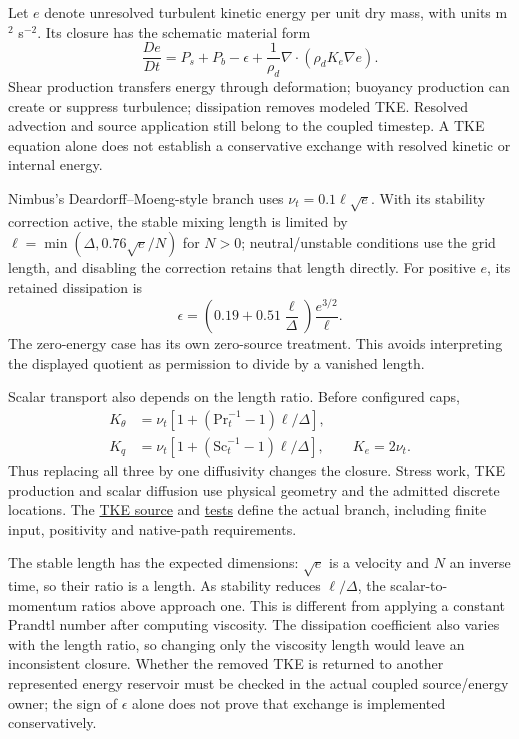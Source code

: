 Let $e$ denote unresolved turbulent kinetic energy per unit dry mass, with units
m$^2$ s$^{-2}$. Its closure has the schematic material form
\[
 \frac{De}{Dt}=P_s+P_b-\epsilon
       +\frac{1}{\rho_d}\nabla\!\cdot(\rho_dK_e\nabla e).
\]
Shear production transfers energy through deformation; buoyancy production can
create or suppress turbulence; dissipation removes modeled TKE. Resolved
advection and source application still belong to the coupled timestep. A TKE
equation alone does not establish a conservative exchange with resolved kinetic
or internal energy.

Nimbus's Deardorff--Moeng-style branch uses $\nu_t=0.1\ell\sqrt e$. With its
stability correction active, the stable mixing length is limited by
$\ell=\min(\Delta,0.76\sqrt e/N)$ for $N>0$; neutral/unstable conditions use
the grid length, and disabling the correction retains that length directly.
For positive $e$, its retained dissipation is
\[
 \epsilon=\left(0.19+0.51\frac{\ell}{\Delta}\right)
             \frac{e^{3/2}}{\ell}.
\]
The zero-energy case has its own zero-source treatment. This avoids interpreting
the displayed quotient as permission to divide by a vanished length.

Scalar transport also depends on the length ratio. Before configured caps,
\[
\begin{aligned}
 K_\theta&=\nu_t\left[1+
        (\mathrm{Pr}_t^{-1}-1)\ell/\Delta\right],\\
 K_q&=\nu_t\left[1+
        (\mathrm{Sc}_t^{-1}-1)\ell/\Delta\right],\qquad K_e=2\nu_t.
\end{aligned}
\]
Thus replacing all three by one diffusivity changes the closure. Stress work,
TKE production and scalar diffusion use physical geometry and the admitted
discrete locations. The
\href{../src/turbulence/schemes/tke/tke.cpp}{TKE source} and
\href{../tests/physics/test_tke_scheme.cpp}{tests} define the actual branch,
including finite input, positivity and native-path requirements.

The stable length has the expected dimensions: $\sqrt e$ is a velocity and
$N$ an inverse time, so their ratio is a length. As stability reduces
$\ell/\Delta$, the scalar-to-momentum ratios above approach one. This is
different from applying a constant Prandtl number after computing viscosity.
The dissipation coefficient also varies with the length ratio, so changing
only the viscosity length would leave an inconsistent closure. Whether the
removed TKE is returned to another represented energy reservoir must be checked
in the actual coupled source/energy owner; the sign of $\epsilon$ alone does
not prove that exchange is implemented conservatively.

